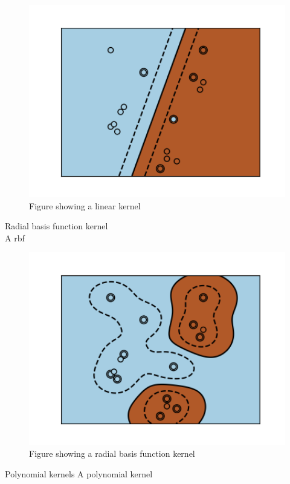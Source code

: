 \documentclass[11pt]{article}
\begin{document}
\begin{figure}[ht]
  \centering
  \includegraphics[width=12cm]{graphics/kernel_linear.png}
  \caption{Figure showing a linear kernel}
\end{figure}

\large{Radial basis function kernel}\\
A \gls{rbf}

\begin{figure}[ht]
  \centering
  \includegraphics[width=12cm]{graphics/kernel_rbf.png}
  \caption{Figure showing a radial basis function kernel}
\end{figure}

\large{Polynomial kernels}
A polynomial kernel
\end{document}
